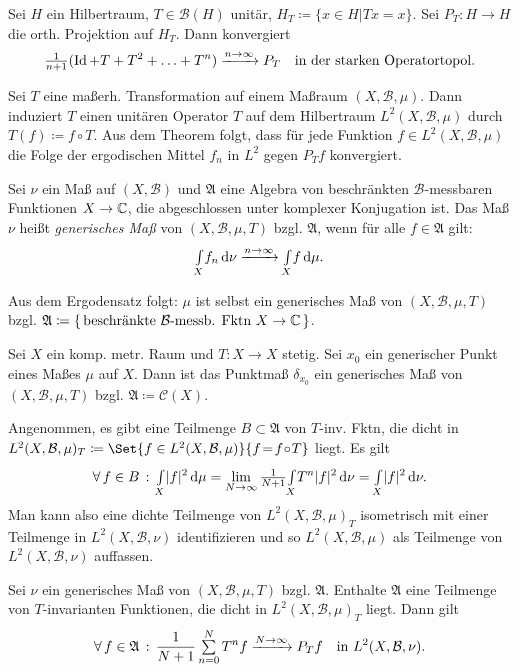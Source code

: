 \documentclass{cheat-sheet}
\newcommand{\Bor}{\mathcal{B}} %
\newcommand{\meST}{$(X, \Bor, \mu, T)$} %
\newcommand{\Cont}{\mathcal{C}} %
\newcommand{\Alg}{\mathfrak{A}} %
\newcommand{\Boun}{\mathcal{B}} %
\begin{document}
\begin{thm}
  Sei $H$ ein Hilbertraum, $T \!\in\! \Boun(H)$ unitär, $H_T \!\coloneqq\! \{ x {\in} H | Tx \!=\! x \}$. Sei $P_T : H \to H$ die orth. Projektion auf $H_T$. Dann konvergiert
  \[
    \tfrac{1}{n+1} (\operatorname{Id} + T + T^2 + \ldots + T^n) \xrightarrow{n \to \infty} P_T \quad
    \text{in der starken Operatortopol.}
  \]
\end{thm}

\begin{bem}
  Sei $T$ eine maßerh. Transformation auf einem Maßraum $(X, \Bor, \mu)$. Dann induziert $T$ einen unitären Operator $T$ auf dem Hilbertraum $L^2(X, \Bor, \mu)$ durch $T(f) \coloneqq f \circ T$. Aus dem Theorem folgt, dass für jede Funktion $f \in L^2(X, \Bor, \mu)$ die Folge der ergodischen Mittel $f_n$ in $L^2$ gegen $P_T f$ konvergiert.
\end{bem}

\begin{defn}
  Sei $\nu$ ein Maß auf $(X, \Bor)$ und $\Alg$ eine Algebra von beschränkten $\Bor$-messbaren Funktionen $X \to \mathbb{C}$, die abgeschlossen unter komplexer Konjugation ist. Das Maß $\nu$ heißt \emph{generisches Maß} von \meST{} bzgl. $\Alg$, wenn für alle $f \in \Alg$ gilt:
  \[ {\textstyle \int\limits_{X}^{}} f_n \,\mathrm{d} \nu \xrightarrow{n \to \infty} {\textstyle \int\limits_{X}^{}} f \,\mathrm{d} \mu. \]
\end{defn}

\begin{bem}
  Aus dem Ergodensatz folgt: $\mu$ ist selbst ein generisches Maß von \meST{} bzgl. $\Alg \coloneqq \{\, \text{beschränkte $\Bor$-messb. Fktn $X \to \C$} \,\}$.
\end{bem}

\begin{bem}
  Sei $X$ ein komp. metr. Raum und $T : X \to X$ stetig.
  Sei $x_0$ ein generischer Punkt eines Maßes $\mu$ auf $X$.
  Dann ist das Punktmaß $\delta_{x_0}$ ein generisches Maß von \meST{} bzgl. $\Alg \coloneqq \Cont(X)$.
\end{bem}

\begin{bem}
  Angenommen, es gibt eine Teilmenge $B \subset \Alg$ von $T$-inv. Fktn, die dicht in $L^2(X, \Bor, \mu)_T \coloneqq \Set{f \in L^2(X, \Bor, \mu)}{f \!=\! f \!\circ\! T}$ liegt. Es gilt
  \[
    \forall \, {f \in B} \,:\,
    {\textstyle \int\limits_{X}^{}} \lvert f\rvert^2 \,\mathrm{d} \mu = \lim_{N \to \infty} \tfrac{1}{N+1} {\textstyle \int\limits_{X}^{}} T^n \lvert f\rvert^2 \,\mathrm{d} \nu = {\textstyle \int\limits_{X}^{}} \lvert f\rvert^2 \,\mathrm{d} \nu.
  \]
  Man kann also eine dichte Teilmenge von $L^2(X, \Bor, \mu)_T$ isometrisch mit einer Teilmenge in $L^2(X, \Bor, \nu)$ identifizieren und so $L^2(X, \Bor, \mu)$ als Teilmenge von $L^2(X, \Bor, \nu)$ auffassen.
\end{bem}

\begin{thm}
  Sei $\nu$ ein generisches Maß von \meST{} bzgl. $\Alg$. Enthalte $\Alg$ eine Teilmenge von $T$-invarianten Funktionen, die dicht in $L^2(X, \Bor, \mu)_T$ liegt. Dann gilt
  \[
    \fa{f \in \Alg}
    \frac{1}{N+1} \sum_{n=0}^N T^n f \xrightarrow{N \to \infty} P_T f \quad
    \text{in } L^2(X, \Bor, \nu).
  \]
\end{thm}
\end{document}
